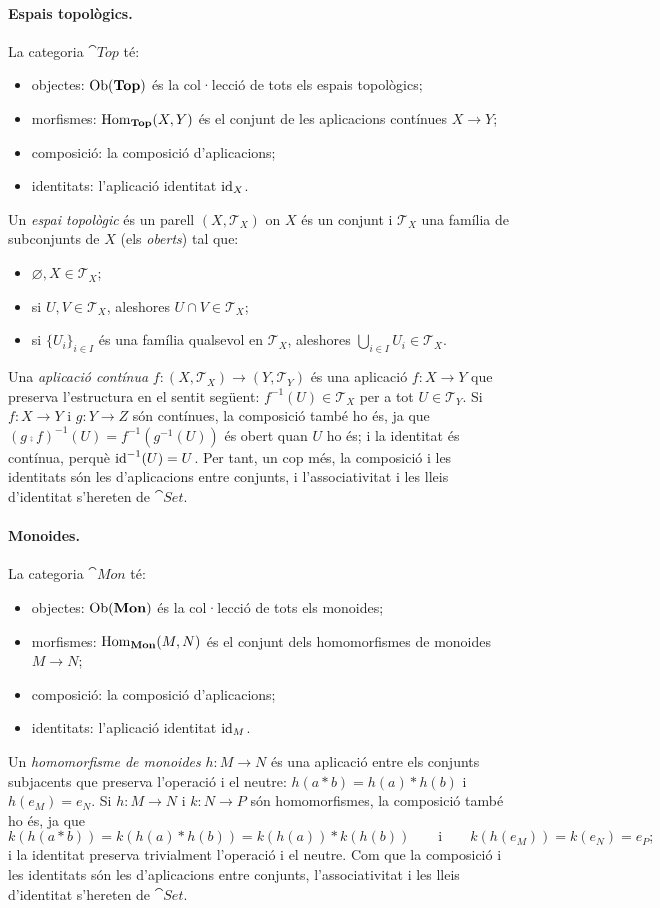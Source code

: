\paragraph{Espais topològics.}
La categoria $\cat{Top}$ té:
\begin{itemize}
\item objectes: $\operatorname{Ob}(\mathbf{Top})$ és la col·lecció de tots els espais topològics;
\item morfismes: $\operatorname{Hom}_{\mathbf{Top}}(X,Y)$ és el conjunt de les aplicacions contínues $X\to Y$;
\item composició: la composició d'aplicacions;
\item identitats: l'aplicació identitat $\operatorname{id}_{X}$.
\end{itemize}
Un \emph{espai topològic} és un parell $(X,\mathcal{T}_X)$ on $X$ és un conjunt i $\mathcal{T}_X$ una família de subconjunts de $X$ (els \emph{oberts}) tal que:
\begin{itemize}
\item $\varnothing, X\in\mathcal{T}_X$;
\item si $U,V\in\mathcal{T}_X$, aleshores $U\cap V\in\mathcal{T}_X$;
\item si $\{U_i\}_{i\in I}$ és una família qualsevol en $\mathcal{T}_X$, aleshores $\bigcup_{i\in I}U_i\in\mathcal{T}_X$.
\end{itemize}
Una \emph{aplicació contínua} $f\colon(X,\mathcal{T}_X)\to(Y,\mathcal{T}_Y)$ és una aplicació $f\colon X\to Y$ que preserva l'estructura en el sentit següent: $f^{-1}(U)\in\mathcal{T}_X$ per a tot $U\in\mathcal{T}_Y$. Si $f\colon X\to Y$ i $g\colon Y\to Z$ són contínues, la composició també ho és, ja que $(g\comp f)^{-1}(U)=f^{-1}(g^{-1}(U))$ és obert quan $U$ ho és; i la identitat és contínua, perquè $\operatorname{id}^{-1}(U)=U$. Per tant, un cop més, la composició i les identitats són les d'aplicacions entre conjunts, i l'associativitat i les lleis d'identitat s'hereten de $\cat{Set}$.

\paragraph{Monoides.}
La categoria $\cat{Mon}$ té:
\begin{itemize}
\item objectes: $\operatorname{Ob}(\mathbf{Mon})$ és la col·lecció de tots els monoides;
\item morfismes: $\operatorname{Hom}_{\mathbf{Mon}}(M,N)$ és el conjunt dels homomorfismes de monoides $M\to N$;
\item composició: la composició d'aplicacions;
\item identitats: l'aplicació identitat $\operatorname{id}_{M}$.
\end{itemize}
Un \emph{homomorfisme de monoides} $h\colon M\to N$ és una aplicació entre els conjunts subjacents que preserva l'operació i el neutre: $h(a\ast b)=h(a)\ast h(b)$ i $h(e_M)=e_N$. Si $h\colon M\to N$ i $k\colon N\to P$ són homomorfismes, la composició també ho és, ja que
\[
k(h(a\ast b))=k(h(a)\ast h(b))=k(h(a))\ast k(h(b))\qquad\text{i}\qquad k(h(e_M))=k(e_N)=e_P;
\]
i la identitat preserva trivialment l'operació i el neutre. Com que la composició i les identitats són les d'aplicacions entre conjunts, l'associativitat i les lleis d'identitat s'hereten de $\cat{Set}$.

